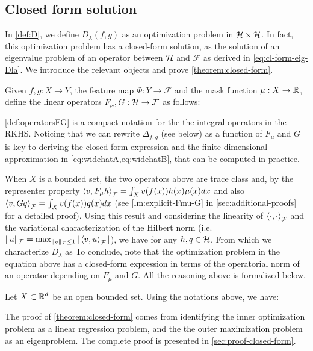 \subsection{Closed form solution}
In \cref{def:D}, we define $D_\lambda(f,g)$ as an optimization problem in $\mathcal H \times \mathcal H$. In fact, this optimization problem has a closed-form solution, as the solution of an eigenvalue problem of an operator between $\mathcal H$ and $\mathcal F$ as derived in \cref{eq:cl-form-eig-Dla}. We introduce the relevant objects and prove \cref{theorem:closed-form}.

\begin{definition}[Operators $F_\mu$, $G$]\label{def:operatorsFG}
Given $f, g: X \to Y$, the feature map $\Phi: Y\to \mathcal F$ and the mask function $\mu:X \to \mathbb R$, define the linear operators $F_\mu, G:\mathcal H \to {\cal F}$ as follows:
\end{definition}

\cref{def:operatorsFG} is a compact notation for the the integral operators in the RKHS. Noticing that we can rewrite $\Delta_{f,g}$ (see below) as a function of $F_\mu$ and $G$ is key to deriving the closed-form expression and the finite-dimensional approximation in \cref{eq:widehatA,eq:widehatB}, that can be computed in practice.

When $X$ is a bounded set, the two operators above are trace class and, by the representer property  $\left\langle{v},{F_\mu h}\right\rangle_{\cal F} = \int_X v(f(x)) h(x) \mu(x) dx$ and also $\left\langle{v},{G q}\right\rangle_{\cal F} = \int_X v(f(x)) q(x) dx$ (see \cref{lm:explicit-Fmu-G} in \cref{sec:additional-proofs} for a detailed proof). Using this result and considering the linearity of $\left\langle{\cdot},{\cdot}\right\rangle_{\cal F}$ and the variational characterization of the Hilbert norm (i.e. $\|u\|_{\cal F} = \max_{\|v\|_{\cal F} \leq 1} |\left\langle{v},{u}\right\rangle_{\cal F}|$), we have
for any $h, q \in \mathcal H$. From which we characterize $D_\lambda$ as
To conclude, note that the optimization problem in the equation above has a closed-form expression in terms of the operatorial norm of an operator depending on $F_\mu$ and $G$. All the reasoning above is formalized below.
\begin{theorem}\label{theorem:closed-form}
Let $X \subset \mathbb R^d$ be an open bounded set. Using the notations above, we have:
\end{theorem}
The proof of \cref{theorem:closed-form} comes from identifying the inner optimization problem as a linear regression problem, and the the outer maximization problem as an eigenproblem. The complete proof is presented in \cref{sec:proof-closed-form}.

